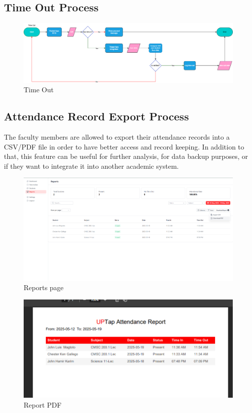 \clearpage
\subsection{Time Out Process}
\begin{figure}[h] %
	\centering
	\includegraphics[width=1.0\textwidth]{figures/chapter4/timeout1.png} %
	\caption{Time Out}
	\label{fig:timeout}
\end{figure}

\subsection{Attendance Record Export Process}
The faculty members are allowed to export their attendance records into a CSV/PDF file in order to have better access and record keeping. In addition to that, this feature can be useful for further analysis, for data backup purposes, or if they want to integrate it into another academic system. 
\begin{figure}[h] %
	\centering
	\includegraphics[width=1.0\textwidth]{figures/chapter4/att_ui.png} %
	\caption{Reports page}
	\label{fig:att_ui}
\end{figure}
\begin{figure}[h] %
	\centering
	\includegraphics[width=1.0\textwidth]{figures/chapter4/att_report.png} %
	\caption{Report PDF}
	\label{fig:att_report}
\end{figure}
\clearpage
